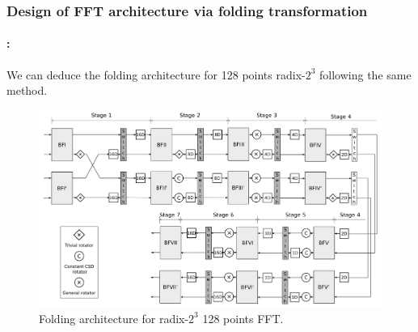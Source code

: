 \begin{frame}
	\frametitle{\textbf{Design of FFT architecture via folding transformation}}
	\framesubtitle{\secname : \subsecname}
	\begin{block}{\centering }
	We can deduce the folding architecture for 128 points radix-$2^3$ following the same method. 
	\end{block}	
	\vspace{-0.15cm}
		\begin{figure}[h!] \centering
		   	\includegraphics[width=0.75\paperwidth]{./image/folding-128.png}
		   	\vspace{-0.15cm}
		   	\caption{ \tiny Folding architecture for radix-$2^3$ 128 points FFT.}
		\end{figure}  	
\end{frame}